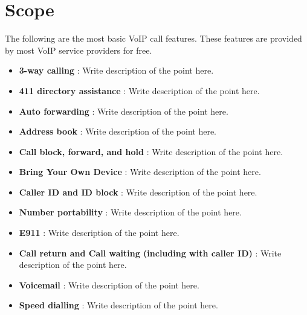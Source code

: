 \section{Scope}
The following are the most basic VoIP call features. These features are provided by most VoIP service providers for free.
\begin{itemize}
\item \textbf{3-way calling} : Write description of the point here.
\item \textbf{411 directory assistance} : Write description of the point here.
\item \textbf{Auto forwarding} : Write description of the point here.
\item \textbf{Address book} : Write description of the point here.
\item \textbf{Call block, forward, and hold} : Write description of the point here.
\item \textbf{Bring Your Own Device} : Write description of the point here.
\item \textbf{Caller ID and ID block} : Write description of the point here.
\item \textbf{Number portability} : Write description of the point here.
\item \textbf{E911} : Write description of the point here.
\item \textbf{Call return and Call waiting (including with caller ID)} : Write description of the point here.
\item \textbf{Voicemail} : Write description of the point here.
\item \textbf{Speed dialling} : Write description of the point here.
\end{itemize}


\newpage


